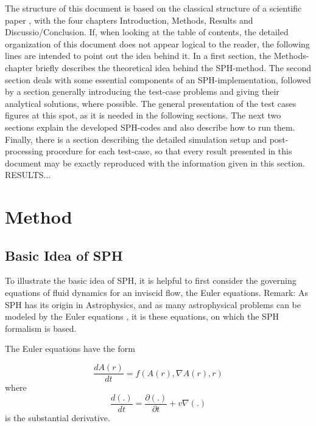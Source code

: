 \documentclass{report}
\begin{document}
The structure of this document is based on the classical structure of a scientific paper \cite{Day2006}, with the four chapters Introduction, Methods, Results and Discussio/Conclusion. If, when looking at the table of contents, the detailed organization of this document does not appear logical to the reader, the following lines are intended to point out the idea behind it.
In a first section, the Methods-chapter briefly describes the theoretical idea behind the SPH-method. The second section deals with some essential components of an SPH-implementation, followed by a section generally introducing the test-case problems and giving their analytical solutions, where possible. The general presentation of the test cases figures at this spot, as it is needed in the following sections. The next two sections explain the developed SPH-codes and also describe how to run them. Finally, there is a section describing the detailed simulation setup and post-processing procedure for each test-case, so that every result presented in this document may be exactly reproduced with the information given in this section.
RESULTS...



\chapter{Method}
\label{sec:method}
\section{Basic Idea of SPH}
\label{sec:BasicsSPH}

To illustrate the basic idea of SPH, it is helpful to first consider the
governing equations of fluid dynamics for an inviscid flow, the Euler equations. Remark: As SPH has its origin in Astrophysics, and as many astrophysical problems can be modeled by the Euler equations \cite{Liu2003}, it is these equations, on which the SPH formalism is based. 


The Euler equations have the form~\cite{Monaghan2005}

\begin {equation}
\label{eq:EFD_form}
{\frac{dA(r)}{dt}}=f(A(r),\nabla A(r),r)
\end {equation}
where
\begin {equation}
{\frac{d(.)}{dt}}={\frac{\partial(.)}{ \partial t}}+v\nabla(.)
\end{equation}
is the substantial derivative.
\end{document}
